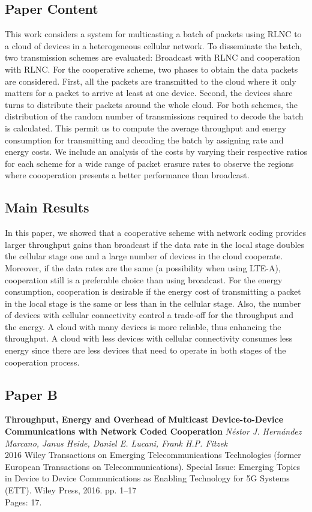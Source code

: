 \subsection*{Paper Content}
This work considers a system for multicasting a batch of packets using \ac{RLNC} to a cloud of devices in a heterogeneous cellular network. To disseminate the batch, two transmission schemes are evaluated: Broadcast with \ac{RLNC} and cooperation with \ac{RLNC}. For the cooperative scheme, two phases to obtain the data packets are considered. First, all the packets are transmitted to the cloud where it only matters for a packet to arrive at least at one device. Second, the devices share turns to distribute their packets around the whole cloud. For both schemes, the distribution of the random number of transmissions required to decode the batch is calculated. This permit us to compute the average throughput and energy consumption for transmitting and decoding the batch by assigning rate and energy costs. We include an analysis of the costs by varying their respective ratios for each scheme for a wide range of packet erasure rates to observe the regions where coooperation presents a better performance than broadcast.

\subsection*{Main Results}
In this paper, we showed that a cooperative scheme with network coding provides larger throughput gains than broadcast if the data rate in the local stage doubles the cellular stage one and a large number of devices in the cloud cooperate. Moreover, if the data rates are the same (a possibility when using \ac{LTE-A}), cooperation still is a preferable choice than using broadcast. For the energy consumption, cooperation is desirable if the energy cost of transmitting a packet in the local stage is the same or less than in the cellular stage. Also, the number of devices with cellular connectivity control a trade-off for the throughput and the energy. A cloud with many devices is more reliable, thus enhancing the throughput. A cloud with less devices with cellular connectivity consumes less energy since there are less devices that need to operate in both stages of the cooperation process.

\clearpage

\subsection{Paper B}
\textbf{Throughput, Energy and Overhead of Multicast Device-to-Device Communications with Network Coded Cooperation}
\textit{N\'estor J. Hern\'andez Marcano, Janus Heide, Daniel E. Lucani, Frank H.P. Fitzek}
\\  2016 Wiley Transactions on Emerging Telecommunications Technologies (former
European Transactions on Telecommunications). Special Issue: Emerging Topics in
Device to Device Communications as Enabling Technology for 5G Systems (ETT). Wiley Press, 2016. pp. 1--17
\\ Pages: 17.

